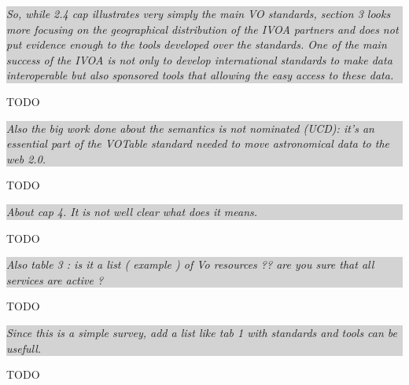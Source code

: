 \documentclass[a4paper]{article}
\newcommand{\quoting}[1]{
  
  
  \colorbox{lightgray}{
    \begin{minipage}{0.98\linewidth}
      \em #1
    \end{minipage}
  }
  
  
}
\begin{document}
\quoting{
So, while 2.4 cap illustrates very simply the main VO standards, section 3 looks
more focusing on the geographical distribution of the IVOA partners and does not
put evidence enough to the tools developed over the standards. One of the main
success of the IVOA is not only to develop international standards to make data
interoperable but also sponsored tools that allowing the easy access to these
data.
}

TODO

\quoting{
Also the big work done about the semantics is not nominated (UCD): it's an
essential part of the VOTable standard needed to move astronomical data to the
web 2.0.
}
TODO

\quoting{
About cap 4. It is not well clear what does it means. 
}

TODO

\quoting{
Also table 3 : is it a list ( example ) of Vo resources ??  are you sure that
all services are active ?
}

TODO

\quoting{
Since this is a simple survey, add a list like tab 1 with standards and tools
can be usefull.
}

TODO
\end{document}
